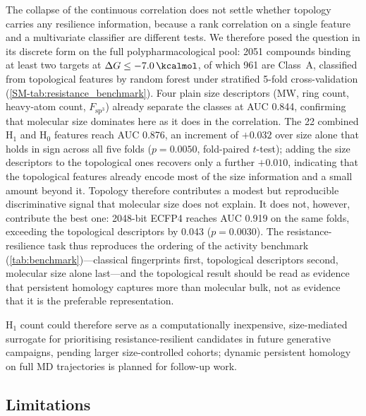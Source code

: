 \documentclass[11pt,a4paper]{article}
\begin{document}
The collapse of the continuous correlation does not settle whether topology carries any resilience information, because a rank correlation on a single feature and a multivariate classifier are different tests. We therefore posed the question in its discrete form on the full polypharmacological pool: \num{2051} compounds binding at least two targets at $\Delta G \leq \SI{-7.0}{\kcalmol}$, of which \num{961} are Class~A, classified from topological features by random forest under stratified 5-fold cross-validation (\cref{SM-tab:resistance_benchmark}). Four plain size descriptors (MW, ring count, heavy-atom count, $F_{\mathrm{sp}^3}$) already separate the classes at AUC \num{0.844}, confirming that molecular size dominates here as it does in the correlation. The 22 combined H$_1$ and H$_0$ features reach AUC \num{0.876}, an increment of $+\num{0.032}$ over size alone that holds in sign across all five folds ($p = \num{0.0050}$, fold-paired $t$-test); adding the size descriptors to the topological ones recovers only a further $+\num{0.010}$, indicating that the topological features already encode most of the size information and a small amount beyond it. Topology therefore contributes a modest but reproducible discriminative signal that molecular size does not explain. It does not, however, contribute the best one: \num{2048}-bit ECFP4 reaches AUC \num{0.919} on the same folds, exceeding the topological descriptors by \num{0.043} ($p = \num{0.0030}$). The resistance-resilience task thus reproduces the ordering of the activity benchmark (\cref{tab:benchmark})---classical fingerprints first, topological descriptors second, molecular size alone last---and the topological result should be read as evidence that persistent homology captures more than molecular bulk, not as evidence that it is the preferable representation.

H$_1$ count could therefore serve as a computationally inexpensive, size-mediated surrogate for prioritising resistance-resilient candidates in future generative campaigns, pending larger size-controlled cohorts; dynamic persistent homology on full MD trajectories is planned for follow-up work.

\subsection{Limitations}
\end{document}

